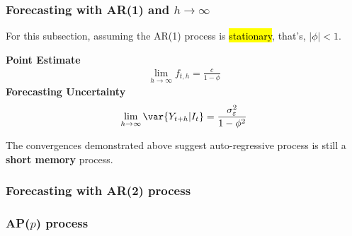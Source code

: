 \documentclass[11pt]{article}
\begin{document}
		\subsubsection{Forecasting with AR(1) and $h \to \infty$}
			\begin{assumption}
				For this subsection, assuming the AR(1) process is \hl{stationary}, that's, $|\phi| < 1$.
			\end{assumption}
			\textbf{Point Estimate}
				\begin{gather}
					\lim_{h \to \infty} f_{t, h} = \frac{c}{1 - \phi}
				\end{gather}
			\textbf{Forecasting Uncertainty}
				\begin{gather}
					\lim_{h \to \infty} \var{Y_{t+h}|I_t} = \frac{\sigma_\varepsilon^2}{1 - \phi^2}
				\end{gather}
			\begin{remark}
				The convergences demonstrated above suggest auto-regressive process is still a \textbf{short memory} process.
			\end{remark}
			
		\subsubsection{Forecasting with AR(2) process}
		
		\subsubsection{AP($p$) process}
\end{document}
